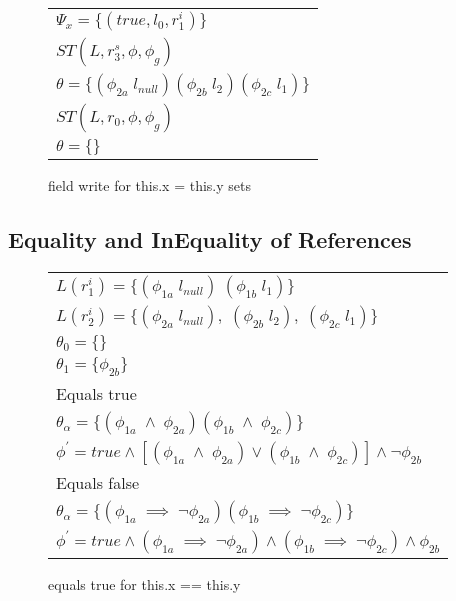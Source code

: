 \begin{figure}[t]
\begin{center}
\begin{tabular}[c]{l}
$\Psi_x = \{ (true, l_0, r_1^i) \}$\\
$ST (L, r_3^s, \phi, \phi_g)$ \\
$\theta = \{ (\phi_{2a}\; l_\mathit{null} ) (\phi_{2b}\; l_2) (\phi_{2c}\; l_1) \}$\\
$ST(L, r_0, \phi, \phi_g)$\\
$\theta = \{ \}$\\
\end{tabular}
\end{center}
\caption{field write for this.x = this.y sets}
\label{fig:faHeapSets}
\end{figure}

\subsection{Equality and InEquality of References}



\begin{figure}
\begin{tabular}[c]{l}
$L(r_1^i) = \{ (\phi_{1a}\; l_\mathit{null})\; (\phi_{1b}\; l_1) \}$ \\
$L(r_2^i) = \{ (\phi_{2a}\; l_\mathit{null}),\; (\phi_{2b}\; l_2),\; (\phi_{2c}\; l_1) \} $\\
  $\theta_0 = \{ \} $\\
$\theta_1 = \{ \phi_{2b}\} $\\ \hline
Equals true \\
$\theta_\alpha = \{ (\phi_{1a}\; \wedge\; \phi_{2a} ) (\phi_{1b}\; \wedge\; \phi_{2c} ) \}$\\
$\phi^\prime = \mathit{true} \wedge [ (\phi_{1a}\; \wedge\; \phi_{2a} )\vee (\phi_{1b}\; \wedge\; \phi_{2c} ) ] \wedge \neg\phi_{2b} $\\ \hline
Equals false \\
$\theta_\alpha = \{ (\phi_{1a}\; \implies\; \neg\phi_{2a} ) (\phi_{1b}\; \implies\; \neg\phi_{2c} ) \}$\\
$\phi^\prime = \mathit{true} \wedge  (\phi_{1a}\; \implies\; \neg\phi_{2a} )\wedge (\phi_{1b}\; \implies\; \neg\phi_{2c} )  \wedge \phi_{2b} $\\ \hline
\end{tabular}
\caption{equals true for this.x == this.y}
\label{fig:eqs-true}
\end{figure}


